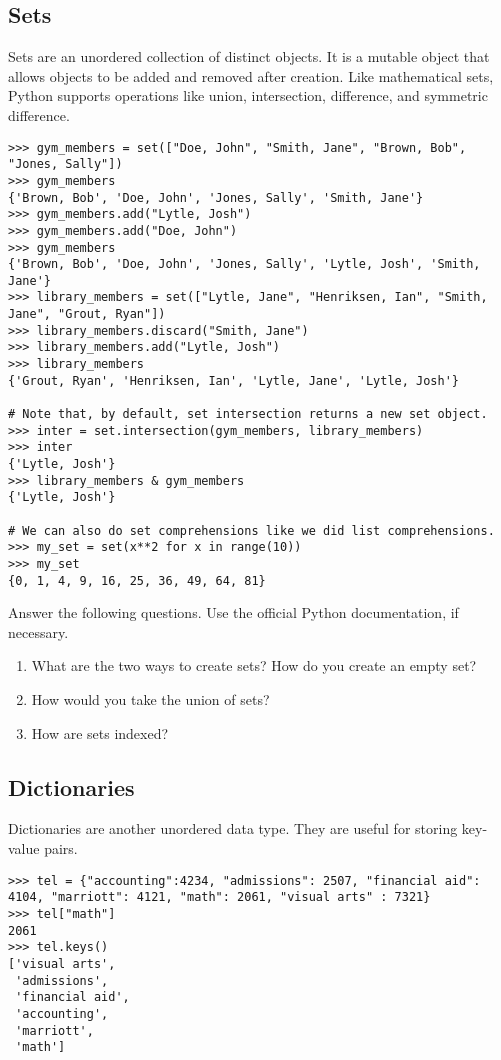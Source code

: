 \subsection*{Sets}
\begin{example}
Sets are an unordered collection of distinct objects.
It is a mutable object that allows objects to be added and removed after creation. 
Like mathematical sets, Python supports operations like union, intersection, 
difference, and symmetric difference.
\begin{lstlisting}
>>> gym_members = set(["Doe, John", "Smith, Jane", "Brown, Bob", "Jones, Sally"])
>>> gym_members
{'Brown, Bob', 'Doe, John', 'Jones, Sally', 'Smith, Jane'}
>>> gym_members.add("Lytle, Josh")
>>> gym_members.add("Doe, John")
>>> gym_members
{'Brown, Bob', 'Doe, John', 'Jones, Sally', 'Lytle, Josh', 'Smith, Jane'}
>>> library_members = set(["Lytle, Jane", "Henriksen, Ian", "Smith, Jane", "Grout, Ryan"])
>>> library_members.discard("Smith, Jane")
>>> library_members.add("Lytle, Josh") 
>>> library_members
{'Grout, Ryan', 'Henriksen, Ian', 'Lytle, Jane', 'Lytle, Josh'}

# Note that, by default, set intersection returns a new set object.
>>> inter = set.intersection(gym_members, library_members)
>>> inter
{'Lytle, Josh'}
>>> library_members & gym_members
{'Lytle, Josh'}

# We can also do set comprehensions like we did list comprehensions.
>>> my_set = set(x**2 for x in range(10))
>>> my_set
{0, 1, 4, 9, 16, 25, 36, 49, 64, 81}
\end{lstlisting}
\end{example}

\begin{problem}
Answer the following questions. Use the official Python documentation, if necessary.
\begin{enumerate}
\item What are the two ways to create sets? How do you create an empty set?
\item How would you take the union of sets?
\item How are sets indexed?
\end{enumerate}
\end{problem}

\subsection*{Dictionaries}
\begin{example}
Dictionaries are another unordered data type.  They are useful for storing key-value pairs.
\begin{lstlisting}
>>> tel = {"accounting":4234, "admissions": 2507, "financial aid": 4104, "marriott": 4121, "math": 2061, "visual arts" : 7321} 
>>> tel["math"]
2061
>>> tel.keys()
['visual arts',
 'admissions',
 'financial aid',
 'accounting',
 'marriott',
 'math'] 
\end{lstlisting}
\end{example}

